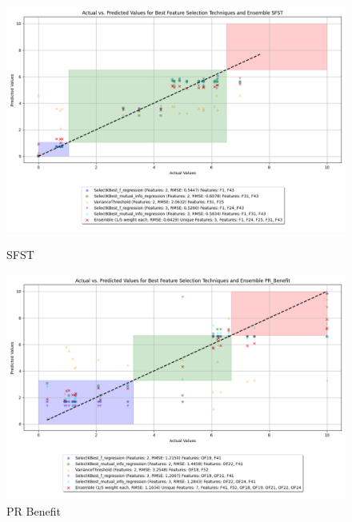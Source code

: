 \begin{figure}[H]
    \centering
    \begin{minipage}{0.45\textwidth}
        \centering
        \includegraphics[width=\linewidth]{reg_section_specific/images_reg_featred_ensemble/actual_vs_predicted_smallest_feature_selection_and_ensemble_SFST.png}
        \caption{SFST}
        \label{fig_reg_spec:sfst_reg_featred_smallest_ensemble}
    \end{minipage}\hfill
    \begin{minipage}{0.45\textwidth}
        \centering
        \includegraphics[width=\linewidth]{reg_section_specific/images_reg_featred_ensemble/actual_vs_predicted_smallest_feature_selection_and_ensemble_PR_Benefit.png}
        \caption{PR Benefit}
        \label{fig_reg_spec:pr_ben_reg_featred_smallest_ensemble}
    \end{minipage}
\end{figure}

